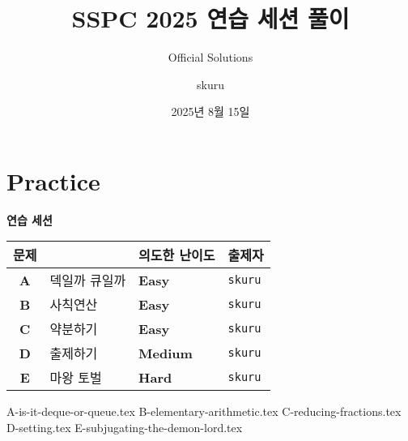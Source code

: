 
\usetikzlibrary{arrows.meta,matrix,decorations.pathreplacing}

\title{SSPC 2025 연습 세션 풀이}
\subtitle{Official Solutions}
\author{skuru}
\date{2025년 8월 15일}


\setcounter{framenumber}{-1}
\frame{\titlepage}

\section{Practice}
\begin{frame}
    {\huge {} \color{main-color} \textbf{연습 세션}}
    \vspace{3mm}
    \begin{center}
        \begin{tabular}{cl|l|l}
            \hline
            문제         &      & 의도한 난이도                         & 출제자            \\
            \hline
            \hline
            \textbf{A} & 덱일까 큐일까 & \textbf{\color{acbronze}Easy}   & \texttt{skuru} \\
            \textbf{B} & 사칙연산 & \textbf{\color{acbronze}Easy}   & \texttt{skuru} \\
            \textbf{C} & 약분하기 & \textbf{\color{acbronze}Easy}   & \texttt{skuru} \\
            \textbf{D} & 출제하기 & \textbf{\color{acgold}Medium} & \texttt{skuru} \\
            \textbf{E} & 마왕 토벌 & \textbf{\color{acplatinum}Hard} & \texttt{skuru} \\
            \hline
        \end{tabular}
    \end{center}
\end{frame}

{A-is-it-deque-or-queue.tex}
{B-elementary-arithmetic.tex}
{C-reducing-fractions.tex}
{D-setting.tex}
{E-subjugating-the-demon-lord.tex}

